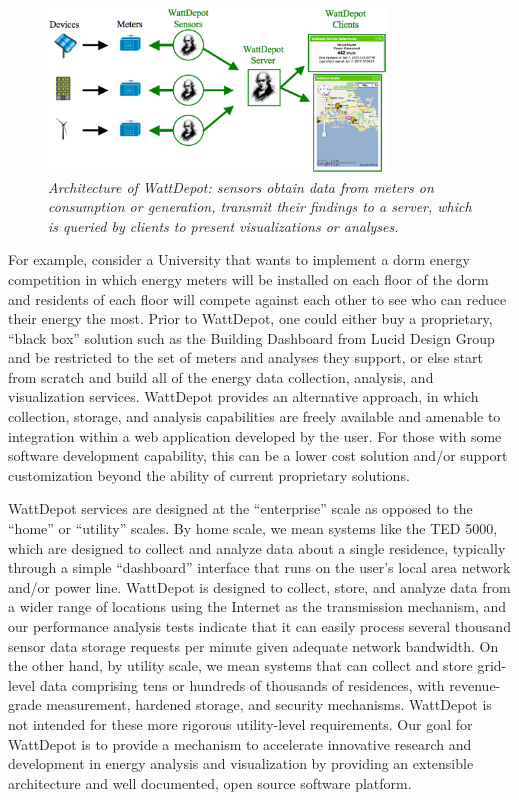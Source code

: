 \documentclass[conference,compsoc]{IEEEtran}
\begin{document}
\begin{figure}[!th]
  \center
  \includegraphics[width=0.8\textwidth]{architecture.eps}
  \caption{\em \small Architecture of WattDepot: sensors obtain data from
    meters on consumption or generation, transmit their findings to a
    server, which is queried by clients to present visualizations or analyses.}
  \label{fig:architecture}
\end{figure} 


For example, consider a University that wants to implement a dorm energy
competition in which energy meters will be installed on each floor of the
dorm and residents of each floor will compete against each other to see who
can reduce their energy the most.  Prior to WattDepot, one could either buy a
proprietary, ``black box'' solution such as the Building Dashboard from
Lucid Design Group and be restricted to the set of meters and analyses they
support, or else start from scratch and build all of the energy data
collection, analysis, and visualization services.  WattDepot provides an
alternative approach, in which collection, storage, and analysis
capabilities are freely available and amenable to integration within a web
application developed by the user.  For those with some software
development capability, this can be a lower cost solution and/or support
customization beyond the ability of current proprietary solutions.

WattDepot services are designed at the ``enterprise'' scale as opposed to
the ``home'' or ``utility'' scales.  By home scale, we mean systems like
the TED 5000, which are designed to collect and analyze data about a single
residence, typically through a simple ``dashboard'' interface that runs on
the user's local area network and/or power line.  WattDepot is designed to
collect, store, and analyze data from a wider range of locations using the
Internet as the transmission mechanism, and our performance analysis tests
indicate that it can easily process several thousand sensor data storage
requests per minute given adequate network bandwidth.  On the other hand,
by utility scale, we mean systems that can collect and store grid-level
data comprising tens or hundreds of thousands of residences, with
revenue-grade measurement, hardened storage, and security mechanisms.
WattDepot is not intended for these more rigorous utility-level
requirements.  Our goal for WattDepot is to provide a mechanism to
accelerate innovative research and development in energy analysis and
visualization by providing an extensible architecture and well documented,
open source software platform.
\end{document}
